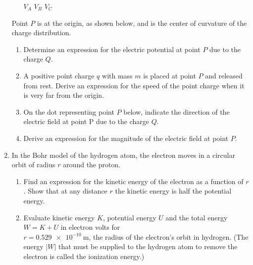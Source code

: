 \documentclass{../../../oss-classkick}
\begin{document}
\begin{enumerate}
\begin{enumerate}
    \vspace{.1in}
    \underline{\hspace{.3in} } $V_A$ \hspace{.3in}
    \underline{\hspace{.3in} } $V_B$ \hspace{.3in}
    \underline{\hspace{.3in} } $V_C$
  \end{enumerate}
  Point $P$ is at the origin, as shown below, and is the center of curvature of
  the charge distribution.
  \begin{enumerate}[resume]
  \item Determine an expression for the electric potential at point $P$ due to
    the charge $Q$.
  \item A positive point charge $q$ with mass $m$ is placed at point $P$ and
    released from rest. Derive an expression for the speed of the point charge
    when it is very far from the origin.
    
  \item On the dot representing point $P$ below, indicate the direction of the
    electric field at point P due to the charge $Q$.
    \begin{center}
    \end{center}
  \item Derive an expression for the magnitude of the electric field at point
    $P$.
  \end{enumerate}
  \vspace{2in}
  \newpage
  
\item In the Bohr model of the hydrogen atom, the electron moves in a circular
  orbit of radius $r$ around the proton.
  \begin{enumerate}
  \item Find an expression for the kinetic energy of the electron as a function
    of $r$. Show that at any distance $r$ the kinetic energy is half the
    potential energy.
  \item Evaluate kinetic energy $K$, potential energy $U$ and the total
    energy $W=K+U$ in electron volts for\\ $r=\SI{0.529e-10}{\metre}$, the
    radius of the electron's orbit in hydrogen. (The energy $|W|$ that must be
    supplied to the hydrogen atom to remove the electron is called the
    ionization energy.)
  \end{enumerate}
  \newpage


\end{enumerate}
\end{document}
